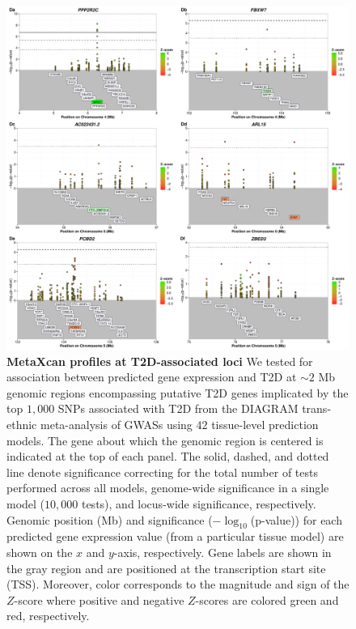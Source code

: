 \documentclass[10pt]{article}
\begin{document}
\begin{figure}
\ContinuedFloat
\includegraphics[width=\textwidth]{sup_fig1_part4_locusArray.pdf}
	\caption{\textbf{MetaXcan profiles at T2D-associated loci} We tested for association between predicted gene expression and T2D at $\sim2$ Mb genomic regions encompassing putative T2D genes implicated by the top $1,000$ SNPs associated with T2D from the DIAGRAM trans-ethnic meta-analysis of GWASs using $42$ tissue-level prediction models. The gene about which the genomic region is centered is indicated at the top of each panel. The solid, dashed, and dotted line denote significance correcting for the total number of tests performed across all models, genome-wide significance in a single model ($10,000$ tests), and locus-wide significance, respectively. Genomic position (Mb) and significance ($-\log_{10}$(p-value)) for each predicted gene expression value (from a particular tissue model) are shown on the $x$ and $y$-axis, respectively. Gene labels are shown in the gray region and are positioned at the transcription start site (TSS). Moreover, color corresponds to the magnitude and sign of the $Z$-score where positive and negative $Z$-scores are colored green and red, respectively.} 
    \label{fig:supp.locus_array_fig1_part4}
\end{figure}
\end{document}
